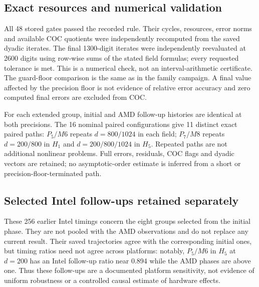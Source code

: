 \documentclass[11pt]{article}
\begin{document}
\clearpage\subsection{Exact resources and numerical validation}\label{subsec:external-validation}




All 48 stored gates passed the recorded rule. Their cycles, resources, error norms and available COC quotients were independently recomputed from the saved dyadic iterates. The final 1300-digit iterates were independently reevaluated at 2600 digits using row-wise sums of the stated field formulas; every requested tolerance is met. This is a numerical check, not an interval-arithmetic certificate. The guard-floor comparison is the same as in the family campaign. A final value affected by the precision floor is not evidence of relative error accuracy and zero computed final errors are excluded from COC.

For each extended group, initial and AMD follow-up histories are identical at both precisions. The 16 nominal paired configurations give 11 distinct exact paired paths: $P_5/M6$ repeats $d=800/1024$ in each field; $P_7/M8$ repeats $d=200/800$ in $H_1$ and $d=200/800/1024$ in $H_5$. Repeated paths are not additional nonlinear problems. Full errors, residuals, COC flags and dyadic vectors are retained; no asymptotic-order estimate is inferred from a short or precision-floor-terminated path.

\subsection{Selected Intel follow-ups retained separately}

These 256 earlier Intel timings concern the eight groups selected from the initial phase. They are not pooled with the AMD observations and do not replace any current result. Their saved trajectories agree with the corresponding initial ones, but timing ratios need not agree across platforms: notably, $P_5/M6$ in $H_5$ at $d=200$ has an Intel follow-up ratio near 0.894 while the AMD phases are above one. Thus these follow-ups are a documented platform sensitivity, not evidence of uniform robustness or a controlled causal estimate of hardware effects.
\end{document}
